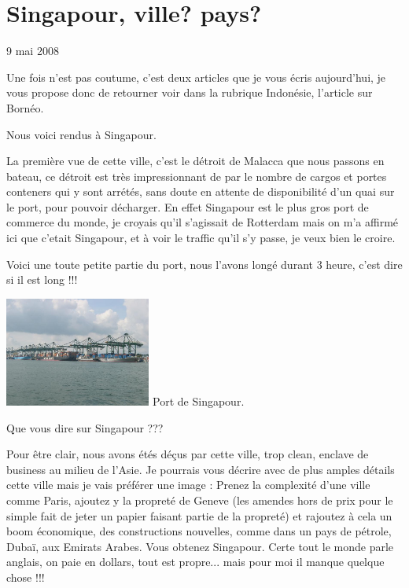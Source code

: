 \section{Singapour, ville? pays?}

9 mai 2008

\begin{multicols}{2}

Une fois n'est pas coutume, c'est deux articles que je vous écris aujourd'hui, je vous propose donc de retourner voir dans la rubrique Indonésie, l'article sur Bornéo.

Nous voici rendus à Singapour.

La première vue de cette ville, c'est le détroit de Malacca que nous passons en bateau, ce détroit est très impressionnant de par le nombre de cargos et portes conteners qui y sont arrétés, sans doute en attente de disponibilité d'un quai sur le port, pour pouvoir décharger. En effet Singapour est le plus gros port de commerce du monde, je croyais qu'il s'agissait de Rotterdam mais on m'a affirmé ici que c'etait Singapour, et à voir le traffic qu'il s'y passe, je veux bien le croire.


Voici une toute petite partie du port, nous l'avons longé durant 3 heure, c'est dire si il est long !!!

\hspace*{-0.65cm}
\includegraphics[width=4.8cm]{articles/Singapour-ville-pays/1210333644359c.jpg}
Port de Singapour.

Que vous dire sur Singapour ???

Pour être clair, nous avons étés déçus par cette ville, trop clean, enclave de business au milieu de l'Asie. Je pourrais vous décrire avec de plus amples détails cette ville mais je vais préférer une image : Prenez la complexité d'une ville comme Paris, ajoutez y la propreté de Geneve (les amendes hors de prix pour le simple fait de jeter un papier faisant partie de la propreté) et rajoutez à cela un boom économique, des constructions nouvelles, comme dans un pays de pétrole, Dubaï, aux Emirats Arabes. Vous obtenez Singapour. Certe tout le monde parle anglais, on paie en dollars, tout est propre... mais pour moi il manque quelque chose !!!


\end{multicols}

